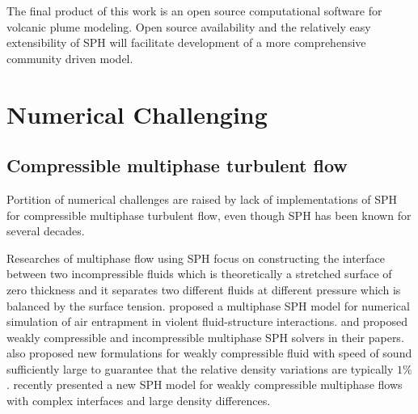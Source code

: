The final product of this work is an open source computational software for volcanic plume modeling. Open source availability and the relatively easy extensibility of SPH will facilitate development of a more comprehensive community driven model.

\section{Numerical Challenging}

\subsection{Compressible multiphase turbulent flow}
Portition of numerical challenges are raised by lack of implementations of SPH for compressible multiphase turbulent flow, even though SPH has been known for several decades.

Researches of multiphase flow using SPH focus on constructing the interface between two incompressible fluids which is theoretically a stretched surface of zero thickness and it separates two different fluids at different pressure which is balanced by the surface tension.
\citet{colagrossi2003numerical} proposed a multiphase SPH model for numerical simulation of air entrapment in violent fluid-structure interactions. \citet{hu2007incompressible} and \citet{adami2010new} proposed weakly compressible and incompressible multiphase SPH solvers in their papers. \citet{monaghan2013simple} also proposed new formulations for weakly compressible fluid with speed of sound sufficiently large to guarantee that the relative density variations are typically $1\%$. \citet {chen2015sph} recently presented a new SPH model for weakly compressible multiphase flows with complex interfaces and large density differences.
 
